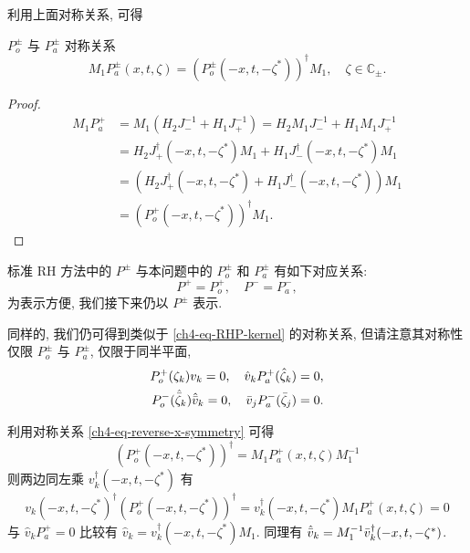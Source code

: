利用上面对称关系, 可得
\begin{proposition}{$P_{o}^{\pm}$ 与 $P_{a}^{\pm}$ 对称关系}\label{ch4-prop:reverse-x-P-symmetry}
    \begin{equation}
        M_{1} P_{a}^{\pm}(x, t, \zeta) = \left( P_{o}^{\pm}(-x, t, -\zeta^{*}) \right)^{\dagger} M_{1}, \quad \zeta \in \mathbb{C}_{\pm}.
    \end{equation}
\end{proposition}
\begin{proof}
    \begin{equation}
        \begin{aligned}
            M_{1} P_{a}^{+} & = M_{1} (H_{2} J_{-}^{-1} + H_{1} J_{+}^{-1}) = H_{2} M_{1} J_{-}^{-1} + H_{1} M_{1} J_{+}^{-1} \\
                            & = H_{2} J_{+}^{\dagger}(-x,t,-\zeta^{*})M_{1} + H_{1} J_{-}^{\dagger}(-x,t,-\zeta^{*})M_{1}     \\
                            & = (H_{2} J_{+}^{\dagger}(-x,t,-\zeta^{*}) + H_{1} J_{-}^{\dagger}(-x,t,-\zeta^{*})) M_{1}       \\
                            & = (P_{o}^{+}(-x,t,-\zeta^{*}))^{\dagger} M_{1}.
        \end{aligned}
    \end{equation}
\end{proof}

标准 RH 方法中的 $P^{\pm}$ 与本问题中的 $P_{o}^{\pm}$ 和 $P_{a}^{\pm}$ 有如下对应关系:
\begin{equation}
    P^{+} = P_{o}^{+}, \quad P^{-} = P_{a}^{-},
\end{equation}
为表示方便, 我们接下来仍以 $P^{\pm}$ 表示.

同样的, 我们仍可得到类似于 \eqref{ch4-eq-RHP-kernel} 的对称关系, 但请注意其对称性仅限 $P_{o}^{\pm}$ 与 $P_{a}^{\pm}$, 仅限于同半平面,
\begin{equation}
    \begin{aligned}
        P_{o}^{+}(\zeta_{k}) v_{k} = 0, \quad \hat{v}_{k} P_{a}^{+}(\hat{\zeta}_{k})  = 0,          \\
        P_{o}^{-}(\hat{\bar{\zeta}}_{k}) \hat{\bar{v}}_{k} = 0, \quad \bar{v}_{j} P_{a}^{-}(\bar{\zeta}_{j}) = 0. \\
    \end{aligned}
\end{equation}

利用对称关系 \eqref{ch4-eq-reverse-x-symmetry} 可得
\begin{equation}
    (P_{o}^{+}(-x,t,-\zeta^{*}))^{\dagger} = M_{1} P_{a}^{+}(x,t,\zeta) M_{1}^{-1}
\end{equation}
则两边同左乘 $v_{k}^{\dagger}(-x,t,-\zeta^{*})$ 有
\begin{equation}
    v_{k}(-x,t,-\zeta^{*})^{\dagger} (P_{o}^{+}(-x,t,-\zeta^{*}))^{\dagger} = v_{k}^{\dagger}(-x,t,-\zeta^{*}) M_{1} P_{a}^{+}(x,t,\zeta) = 0
\end{equation}
与 $\hat{v}_{k} P_{a}^{+} = 0$ 比较有 $\hat{v}_{k} = v_{k}^{\dagger}(-x,t,-\zeta^{*})M_{1}$. 同理有 $\hat{\bar{v}}_{k} = M_{1}^{-1} \bar{v}_{k}^{\dagger}(-x,t,-\zeta^{*})$.
\iffalse
